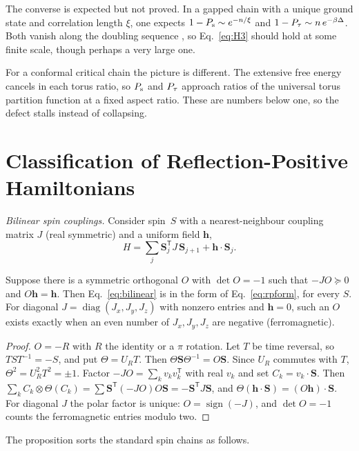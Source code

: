 \documentclass[aps,prl,reprint,amsmath,amssymb,nofootinbib,raggedbottom]{revtex4-2}
\begin{document}
The converse is expected but not proved. In a gapped chain with a unique
ground state and correlation length $\xi$, one expects
$1-P_{\mathrm s}\sim e^{-n/\xi}$ and $1-P_{\tau}\sim n\,e^{-\beta\Delta}$. Both vanish
along the doubling sequence \torusseq, so Eq.~\eqref{eq:H3} should hold at
some finite scale, though perhaps a very large one.

For a conformal critical chain the picture is different. The extensive free
energy cancels in each torus ratio, so $P_{\mathrm s}$ and $P_{\tau}$ approach ratios of
the universal torus partition function at a fixed aspect ratio. These are
numbers below one, so the defect stalls instead of collapsing.

\section{Classification of Reflection-Positive Hamiltonians}\label{app:catalogue}
\emph{Bilinear spin couplings.} Consider spin~$S$ with a nearest-neighbour
coupling matrix $J$ (real symmetric) and a uniform field $\bm h$,
\begin{equation}
 H=\sum_j\bm S_j^{\mathsf T}J\,\bm S_{j+1}+\bm h\cdot\bm S_j .
 \label{eq:bilinear}
\end{equation}
\begin{proposition}\label{prop:xyz}
Suppose there is a symmetric orthogonal $O$ with $\det O=-1$ such that
$-JO\succeq0$ and $O\bm h=\bm h$. Then Eq.~\eqref{eq:bilinear} is in the form
of Eq.~\eqref{eq:rpform}, for every $S$. For diagonal
$J=\operatorname{diag}(J_x,J_y,J_z)$ with nonzero entries and $\bm h=0$, such
an $O$ exists exactly when an even number of $J_x,J_y,J_z$ are negative
(ferromagnetic).
\end{proposition}
\begin{proof}
$O=-R$ with $R$ the identity or a $\pi$ rotation. Let $T$ be time reversal,
so $TST^{-1}=-S$, and put $\Theta=U_RT$. Then $\Theta\bm S\Theta^{-1}=O\bm S$.
Since $U_R$ commutes with $T$, $\Theta^2=U_R^2T^2=\pm1$. Factor
$-JO=\sum_kv_kv_k^{\mathsf T}$ with real $v_k$ and set
$C_k=v_k\cdot\bm S$. Then
$\sum_kC_k\otimes\Theta(C_k)=\sum\bm S^{\mathsf T}(-JO)O\bm S
=-\bm S^{\mathsf T}J\bm S$, and $\Theta(\bm h\cdot\bm S)=(O\bm h)\cdot\bm S$.
For diagonal $J$ the polar factor is unique: $O=\operatorname{sign}(-J)$,
and $\det O=-1$ counts the ferromagnetic entries modulo two.
\end{proof}
\noindent The proposition sorts the standard spin chains as follows.
\end{document}
